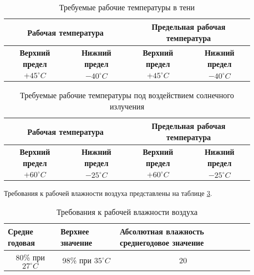 \begin{table}[H]
    \centering
    \begin{tabular}{|c|c|c|c|}
    \hline
    \multicolumn{2}{|c|}{\textbf{Рабочая температура}} & \multicolumn{2}{c|}{\textbf{Предельная рабочая температура}}\\ \hline
       \textbf{Верхний предел} & \textbf{Нижний предел} & \textbf{Верхний предел} & \textbf{Нижний предел} \\ \hline
       \multicolumn{1}{|c|}{$+45^\circ C$}& $-40^\circ C$ & $+45^\circ C$ & $-40^\circ C$ \\ \hline
    \end{tabular}
    \caption{Требуемые рабочие температуры в тени}
    \label{tab:treb-temp-shadow}
\end{table}




\begin{table}[H]
    \centering
    \begin{tabular}{|c|c|c|c|}
    \hline
    \multicolumn{2}{|c|}{\textbf{Рабочая температура}} & \multicolumn{2}{c|}{\textbf{Предельная рабочая температура}}\\ \hline
       \textbf{Верхний предел} & \textbf{Нижний предел} & \textbf{Верхний предел} & \textbf{Нижний предел} \\ \hline
    $+60^\circ C$ & $-25^\circ C$ & $+60^\circ C$ & $-25^\circ C$ \\ \hline
    \end{tabular}
    \caption{Требуемые рабочие температуры под воздействием солнечного излучения}
    \label{tab:treb-temp-solar}
\end{table}


Требования к рабочей влажности воздуха представлены на таблице \ref{tab:rab-vlaj-vozd}.

\begin{table}[H]
    \centering
    \begin{tabular}{|l|l|p{7cm}|}
        \hline
         \textbf{Средне годовая} & \textbf{Верхнее значение} & \textbf{Абсолютная влажность среднегодовое значение} \\ \hline
         \multicolumn{1}{|c|}{ 80\% при $27^\circ C$ } & \multicolumn{1}{c|}{98\% при $35^\circ C$} & \multicolumn{1}{c|}{20}\\ \hline 
    \end{tabular}
    \caption{Требования к рабочей влажности воздуха}
    \label{tab:rab-vlaj-vozd}
\end{table}


